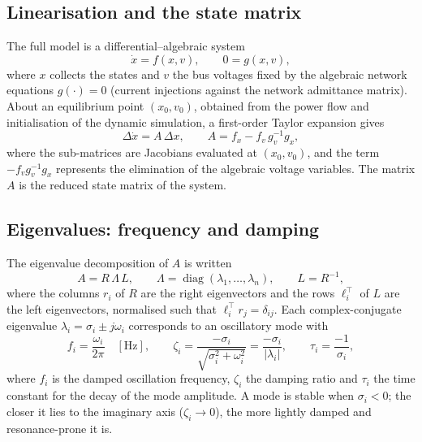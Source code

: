 \subsection{Linearisation and the state matrix}
\label{subsec:linearisation}

The full model is a differential--algebraic system
\begin{equation}
  \dot{x} = f(x, v), \qquad 0 = g(x, v),
  \label{eq:dae}
\end{equation}
where $x$ collects the states and $v$ the bus voltages fixed by the algebraic
network equations $g(\cdot)=0$ (current injections against the network
admittance matrix). About an equilibrium point $(x_0, v_0)$, obtained from the
power flow and initialisation of the dynamic simulation, a first-order Taylor
expansion gives
\begin{equation}
  \Delta \dot{x} = A\,\Delta x,
  \qquad
  A = f_x - f_v\, g_v^{-1} g_x,
  \label{eq:Amatrix}
\end{equation}
where the sub-matrices are Jacobians evaluated at $(x_0,v_0)$, and the term
$-f_v g_v^{-1} g_x$ represents the elimination of the algebraic voltage
variables. The matrix $A$ is the reduced state matrix of the system.

\subsection{Eigenvalues: frequency and damping}
\label{subsec:eigenvalues}

The eigenvalue decomposition of $A$ is written
\begin{equation}
  A = R\,\Lambda\,L, \qquad
  \Lambda = \operatorname{diag}(\lambda_1,\dots,\lambda_n), \qquad
  L = R^{-1},
  \label{eq:eig}
\end{equation}
where the columns $r_i$ of $R$ are the right eigenvectors and the rows
$\ell_i^{\top}$ of $L$ are the left eigenvectors, normalised such that
$\ell_i^{\top} r_j = \delta_{ij}$. Each complex-conjugate eigenvalue
$\lambda_i = \sigma_i \pm j\omega_i$ corresponds to an oscillatory mode with
\begin{equation}
  f_i = \frac{\omega_i}{2\pi} \quad [\si{\hertz}],
  \qquad
  \zeta_i = \frac{-\sigma_i}{\sqrt{\sigma_i^2 + \omega_i^2}}
          = \frac{-\sigma_i}{|\lambda_i|},
  \qquad
  \tau_i = \frac{-1}{\sigma_i},
  \label{eq:fzeta}
\end{equation}
where $f_i$ is the damped oscillation frequency, $\zeta_i$ the damping ratio
and $\tau_i$ the time constant for the decay of the mode amplitude. A mode is
stable when $\sigma_i < 0$; the closer it lies to the imaginary axis
($\zeta_i \to 0$), the more lightly damped and resonance-prone it is.

